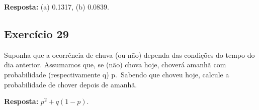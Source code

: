 \documentclass[
  letterpaper,
  DIV=11,
  numbers=noendperiod]{scrartcl}
\begin{document}
\textbf{Resposta:} (a) 0.1317, (b) 0.0839.

\hypertarget{exercuxedcio-29}{%
\subsection{Exercício 29}\label{exercuxedcio-29}}

Suponha que a ocorrência de chuva (ou não) dependa das condições do
tempo do dia anterior. Assumamos que, se (não) chova hoje, choverá
amanhã com probabilidade (respectivamente q) p.~Sabendo que choveu hoje,
calcule a probabilidade de chover depois de amanhã.

\textbf{Resposta:} \(p^2 + q(1 - p)\).
\end{document}
